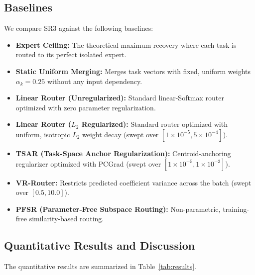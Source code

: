 \subsection{Baselines}
We compare SR3 against the following baselines:
\begin{itemize}
    \item \textbf{Expert Ceiling:} The theoretical maximum recovery where each task is routed to its perfect isolated expert.
    \item \textbf{Static Uniform Merging:} Merges task vectors with fixed, uniform weights $\alpha_k = 0.25$ without any input dependency.
    \item \textbf{Linear Router (Unregularized):} Standard linear-Softmax router optimized with zero parameter regularization.
    \item \textbf{Linear Router ($L_2$ Regularized):} Standard router optimized with uniform, isotropic $L_2$ weight decay (swept over $[1\times 10^{-5}, 5\times 10^{-4}]$).
    \item \textbf{TSAR (Task-Space Anchor Regularization):} Centroid-anchoring regularizer optimized with PCGrad (swept over $[1\times 10^{-5}, 1\times 10^{-3}]$).
    \item \textbf{VR-Router:} Restricts predicted coefficient variance across the batch (swept over $[0.5, 10.0]$).
    \item \textbf{PFSR (Parameter-Free Subspace Routing):} Non-parametric, training-free similarity-based routing.
\end{itemize}

\subsection{Quantitative Results and Discussion}
The quantitative results are summarized in Table~\ref{tab:results}.

